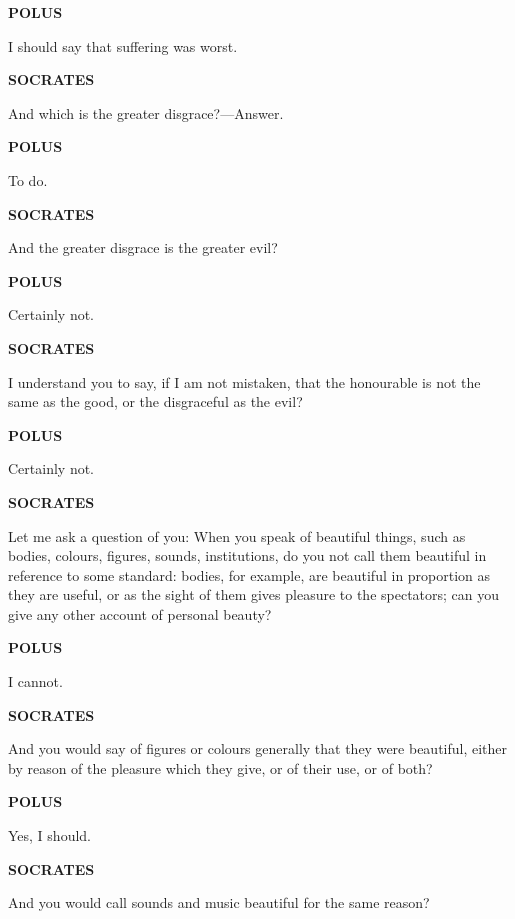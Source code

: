 \documentclass[11pt,letter]{article}
\begin{document}
\par \textbf{POLUS}
\par   I should say that suffering was worst.

\par \textbf{SOCRATES}
\par   And which is the greater disgrace?—Answer.

\par \textbf{POLUS}
\par   To do.

\par \textbf{SOCRATES}
\par   And the greater disgrace is the greater evil?

\par \textbf{POLUS}
\par   Certainly not.

\par \textbf{SOCRATES}
\par   I understand you to say, if I am not mistaken, that the honourable is not the same as the good, or the disgraceful as the evil?

\par \textbf{POLUS}
\par   Certainly not.

\par \textbf{SOCRATES}
\par   Let me ask a question of you:  When you speak of beautiful things, such as bodies, colours, figures, sounds, institutions, do you not call them beautiful in reference to some standard:  bodies, for example, are beautiful in proportion as they are useful, or as the sight of them gives pleasure to the spectators; can you give any other account of personal beauty?

\par \textbf{POLUS}
\par   I cannot.

\par \textbf{SOCRATES}
\par   And you would say of figures or colours generally that they were beautiful, either by reason of the pleasure which they give, or of their use, or of both?

\par \textbf{POLUS}
\par   Yes, I should.

\par \textbf{SOCRATES}
\par   And you would call sounds and music beautiful for the same reason?
\end{document}
